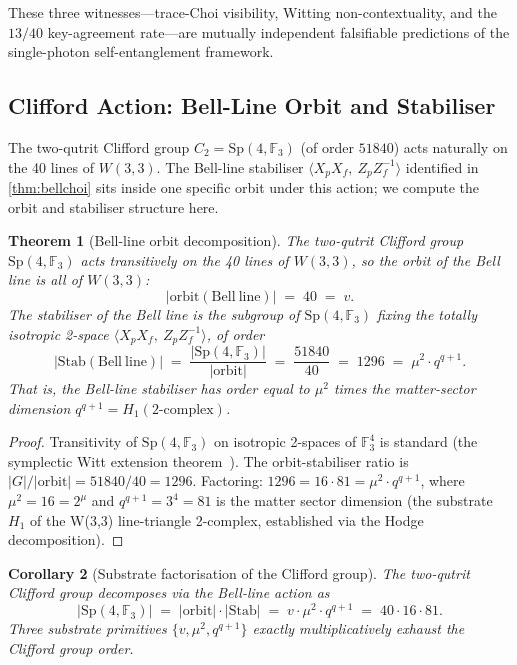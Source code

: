 ﻿\documentclass[12pt]{article}
\newtheorem{theorem}{Theorem}[section]
\newtheorem{corollary}[theorem]{Corollary}
\newcommand{\Sp}{\mathrm{Sp}}
\newcommand{\GF}[1]{\mathbb{F}_{#1}}
\begin{document}
These three witnesses---trace-Choi visibility, Witting non-contextuality,
and the $13/40$ key-agreement rate---are mutually independent
falsifiable predictions of the single-photon self-entanglement framework.

\subsection{Clifford Action: Bell-Line Orbit and Stabiliser}
\label{sec:clifford_orbit}

The two-qutrit Clifford group $C_2 = \Sp(4,\GF{3})$ (of order $51840$) acts
naturally on the 40 lines of $W(3,3)$.  The Bell-line stabiliser
$\langle X_p X_f,\ Z_p Z_f^{-1}\rangle$ identified in \cref{thm:bellchoi} sits
inside one specific orbit under this action; we compute the orbit and
stabiliser structure here.

\begin{theorem}[Bell-line orbit decomposition]\label{thm:orbit}
The two-qutrit Clifford group $\Sp(4,\GF{3})$ acts transitively on the 40
lines of $W(3,3)$, so the orbit of the Bell line is all of $W(3,3)$:
\begin{equation}
  |\mathrm{orbit}(\mathrm{Bell\ line})| \;=\; 40 \;=\; v.
\end{equation}
The stabiliser of the Bell line is the subgroup of $\Sp(4,\GF{3})$ fixing
the totally isotropic 2-space $\langle X_p X_f,\ Z_p Z_f^{-1}\rangle$, of order
\begin{equation}
  |\mathrm{Stab}(\mathrm{Bell\ line})|
  \;=\; \frac{|\Sp(4,\GF{3})|}{|\mathrm{orbit}|}
  \;=\; \frac{51840}{40}
  \;=\; 1296
  \;=\; \mu^2 \cdot q^{q+1}.
\end{equation}
That is, the Bell-line stabiliser has order equal to $\mu^2$ times the
matter-sector dimension $q^{q+1} = H_1(2\text{-complex})$.
\end{theorem}

\begin{proof}
Transitivity of $\Sp(4,\GF{3})$ on isotropic 2-spaces of $\GF{3}^4$ is
standard (the symplectic Witt extension theorem~\cite{Tits1974}).  The
orbit-stabiliser ratio is $|G|/|\mathrm{orbit}| = 51840/40 = 1296$.
Factoring: $1296 = 16 \cdot 81 = \mu^2 \cdot q^{q+1}$, where $\mu^2 = 16 = 2^\mu$
and $q^{q+1} = 3^4 = 81$ is the matter sector dimension (the substrate
$H_1$ of the W(3,3) line-triangle 2-complex, established via the Hodge
decomposition).
\end{proof}

\begin{corollary}[Substrate factorisation of the Clifford group]\label{cor:cliff_factor}
The two-qutrit Clifford group decomposes via the Bell-line action as
\begin{equation}
  |\Sp(4,\GF{3})| \;=\; |\mathrm{orbit}| \cdot |\mathrm{Stab}|
  \;=\; v \cdot \mu^2 \cdot q^{q+1}
  \;=\; 40 \cdot 16 \cdot 81.
\end{equation}
Three substrate primitives $\{v, \mu^2, q^{q+1}\}$ exactly multiplicatively
exhaust the Clifford group order.
\end{corollary}
\end{document}
